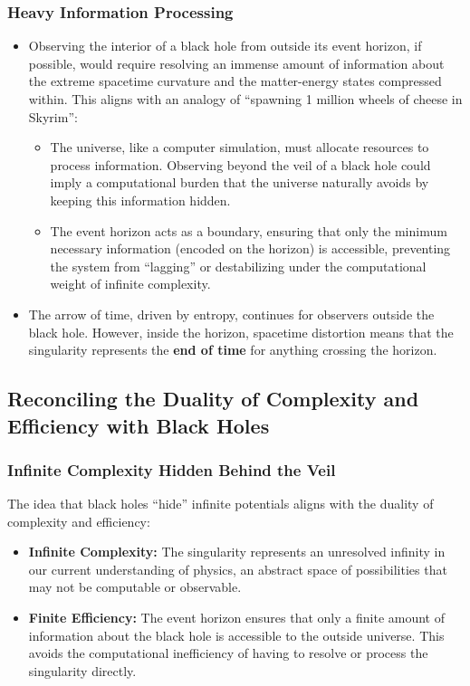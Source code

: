\documentclass[12pt]{article}
\begin{document}
\subsubsection{Heavy Information Processing}
\begin{itemize}
    \item Observing the interior of a black hole from outside its event horizon, if possible, would require resolving an immense amount of information about the extreme spacetime curvature and the matter-energy states compressed within. This aligns with an analogy of ``spawning 1 million wheels of cheese in Skyrim'':
    \begin{itemize}
        \item The universe, like a computer simulation, must allocate resources to process information. Observing beyond the veil of a black hole could imply a computational burden that the universe naturally avoids by keeping this information hidden.
        \item The event horizon acts as a boundary, ensuring that only the minimum necessary information (encoded on the horizon) is accessible, preventing the system from ``lagging'' or destabilizing under the computational weight of infinite complexity.
    \end{itemize}
    
    \item The arrow of time, driven by entropy, continues for observers outside the black hole. However, inside the horizon, spacetime distortion means that the singularity represents the \textbf{end of time} for anything crossing the horizon.
\end{itemize}

\subsection{Reconciling the Duality of Complexity and Efficiency with Black Holes}

\subsubsection{Infinite Complexity Hidden Behind the Veil}

The idea that black holes ``hide'' infinite potentials aligns with the duality of complexity and efficiency:
\begin{itemize}
    \item \textbf{Infinite Complexity:} The singularity represents an unresolved infinity in our current understanding of physics, an abstract space of possibilities that may not be computable or observable.
    \item \textbf{Finite Efficiency:} The event horizon ensures that only a finite amount of information about the black hole is accessible to the outside universe. This avoids the computational inefficiency of having to resolve or process the singularity directly.
\end{itemize}
\end{document}
